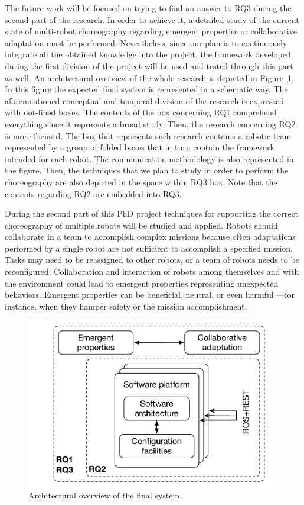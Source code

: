 The future work will be focused on trying to find an answer to RQ3 during the second part of the research.
In order to achieve it, a detailed study of the current state of multi-robot choreography regarding emergent properties or collaborative adaptation must be performed.
Nevertheless, since our plan is to continuously integrate all the obtained knowledge into the project, the framework developed during the first division of the project will be used and tested through this part as well.
An architectural overview of the whole research is depicted in Figure~\ref{fig:overview}.
In this figure the expected final system is represented in a schematic way.
The aforementioned conceptual and temporal division of the research is expressed with dot-lined boxes.
The contents of the box concerning RQ1 comprehend everything since it represents a broad study.
Then, the research concerning RQ2 is more focused.
The box that represents such research contains a robotic team represented by a group of folded boxes that in turn contain the framework intended for each robot.
The communication methodology is also represented in the figure.
Then, the techniques that we plan to study in order to perform the choreography are also depicted in the space within RQ3 box.
Note that the contents regarding RQ2 are embedded into RQ3.

During the second part of this PhD project techniques for supporting the correct choreography of multiple robots will be studied and applied.
Robots should collaborate in a team to accomplish complex missions because often adaptations performed by a single robot are not sufficient to accomplish a specified mission. 
Tasks may need to be reassigned to other robots, or a team of robots needs to be reconfigured. 
Collaboration and interaction of robots among themselves and with the environment could lead to emergent properties representing unexpected behaviors. Emergent properties can be beneficial, neutral, or even harmful ---for instance, when they hamper safety or the mission accomplishment.

\begin{figure}[!t]
\begin{center}
\includegraphics[width=1\linewidth]{Figures/research.pdf}
\caption{Architectural overview of the final system.}
\label{fig:overview}
\end{center}
\end{figure}